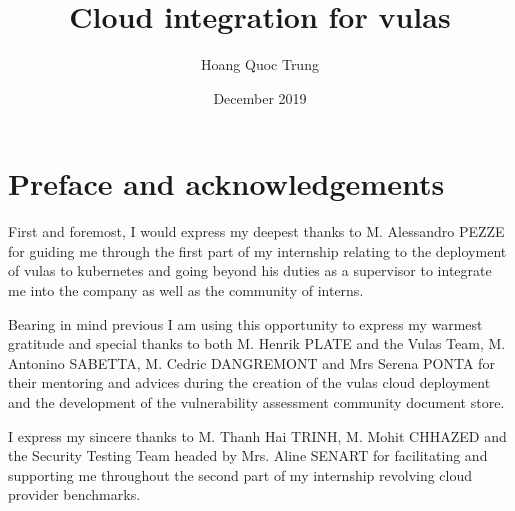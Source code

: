 \documentclass[11pt]{article}
\begin{document}
\newcommand{\shellcmd}[1]{\\\indent\indent\texttt{\footnotesize\# #1}\\}

\renewcommand\labelitemi{---}
\newenvironment{lcases}
  {\left\lbrace\begin{aligned}}
  {\end{aligned}\right.}
  

\newcommand{\subsubsubsection}[1]{\paragraph{#1}\mbox{}\\}
\newcommand{\source}[1]{\caption*{Source: {#1}} }

\setcounter{secnumdepth}{4}
\setcounter{tocdepth}{4}

\title{Cloud integration for vulas}
\author{Hoang Quoc Trung}
\date{December 2019}




\pagebreak
\tableofcontents

\newpage
\section{Preface and acknowledgements}

\hspace{5mm} First and foremost, I would express my deepest thanks to M. Alessandro PEZZE for guiding me through the first part of my internship relating to the deployment of vulas to kubernetes and going beyond his duties as a supervisor to integrate me into the company as well as the community of interns. 

Bearing in mind previous I am using this opportunity to express my warmest gratitude and special thanks to both M. Henrik PLATE and the Vulas Team, M. Antonino SABETTA, M. Cedric DANGREMONT and Mrs Serena PONTA for their mentoring and advices during the creation of the vulas cloud deployment and the development of the vulnerability assessment community document store.

I express my sincere thanks to M. Thanh Hai TRINH, M. Mohit CHHAZED and the Security Testing Team headed by Mrs. Aline SENART for facilitating and supporting me throughout the second part of my internship revolving cloud provider benchmarks. 
\end{document}
